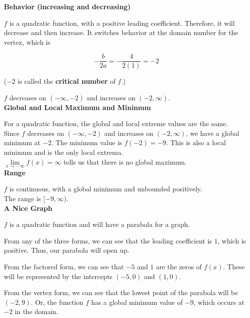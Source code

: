 \documentclass{ximera}
\begin{document}
\begin{example}
\textbf{Behavior (increasing and decreasing)}

$f$ is a quadratic function, with a positive leading coefficient. Therefore, it will decrease and then increase. It switches behavior at the domain number for the vertex, which is


\[
-\frac{b}{2a} = -\frac{4}{2(1)} = -2
\]

($-2$ is called the \textbf{critical number} of $f$.)



$f$ decreases on $(-\infty, -2)$ and increases on $(-2, \infty )$. \\




\textbf{Global and Local Maximum and Minimum}

For a quadratic function, the global and local extreme values are the same. \\



Since $f$ decreases on $(-\infty, -2)$ and increases on $(-2, \infty )$, we have a global minimum at $-2$.   The minimum value is $f(-2) = -9$. This is also a local minimum and is the only local extrema.\\


$\lim\limits_{x \to -\infty} f(x) = \infty$ tells us that there is no global maximum. \\




\textbf{Range}

$f$ is continuous, with a global minimum and unbounded positively. \\

The range is $[-9, \infty)$. \\



\textbf{\textcolor{purple!85!blue}{A Nice Graph}}

$f$ is a quadratic function and will have a parabola for a graph.


From any of the three forms, we can see that the leading coefficient is $1$, which is positive.  Thus, our parabola will open up.


From the factored form, we can see that $-5$ and $1$ are the zeros of $f(x)$.  These will be represented by the intercepts $(-5, 0)$ and $(1,0)$.



From the vertex form, we can see that the lowest point of the parabola will be $(-2, 9)$.  Or, the function $f$ has a global minimum value of $-9$, which occurs at $-2$ in the domain.










\end{example}
\end{document}

